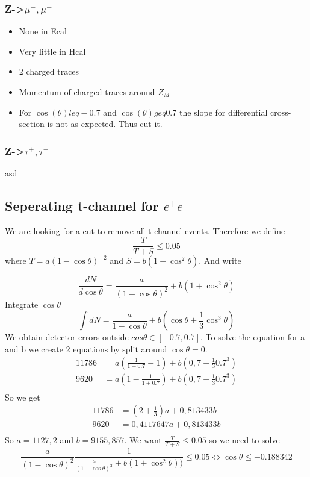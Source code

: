 \documentclass[]{article}
\begin{document}
\subsubsection{Z->$\mu^+, \mu^-$}
\begin{itemize}  
\item None in Ecal
\item Very little in Hcal
\item 2 charged traces
\item Momentum of charged traces around $Z_M$
\item For $\cos(\theta) leq -0.7$ and $\cos(\theta) geq 0.7$ the slope for differential cross-section is not as expected. Thus cut it.
\end{itemize}

\subsubsection{Z->$\tau^+, \tau^-$}
asd

\subsection{Seperating t-channel for $e^+ e^-$}
We are looking for a cut to remove all t-channel events. Therefore we define
\begin{equation}
\frac{T}{T+S} \leq 0.05
\end{equation}
where  $T=a(1-\cos{\theta})^{-2}$  and $S=b(1+\cos^2{\theta})$. And write


\begin{equation}
\frac{dN}{d\cos\theta} = \frac{a}{(1-\cos\theta)^2}+b(1+\cos^2\theta)
\end{equation}
Integrate $\cos\theta$
\begin{equation}
\int dN = \frac{a}{1-\cos\theta} + b\left(\cos\theta+\frac{1}{3}\cos^3\theta\right)
\end{equation}
We obtain detector errors outside $cos\theta \in [-0.7,0.7]$. To solve the equation for a and b we create 2 equations by split around $\cos\theta=0$.
\begin{equation}
\begin{split}
11786 &= a(\frac{1}{1-0.7}-1)+b(0,7+\frac{1}{3}0.7^3) \\
9620 &= a(1-\frac{1}{1+0.7})+b(0,7+\frac{1}{3}0.7^3) \\
\end{split}
\end{equation}
So we get
\begin{equation}
\begin{split}
11786 &= (2+\frac{1}{3})a+0,813433b \\
9620 &= 0,4117647a+ 0,813433b \\
\end{split}
\end{equation}
So $a=1127,2$ and $b=9155,857$.
We want $\frac{T}{T+S} \leq 0.05$ so we need to solve 
\begin{equation}
\frac{a}{(1-\cos\theta)^2}\frac{1}{\frac{a}{(1-\cos\theta)^2}+b(1+\cos^2\theta))} \leq 0.05 \iff \cos\theta \leq -0.188342
\end{equation}
\end{document}
